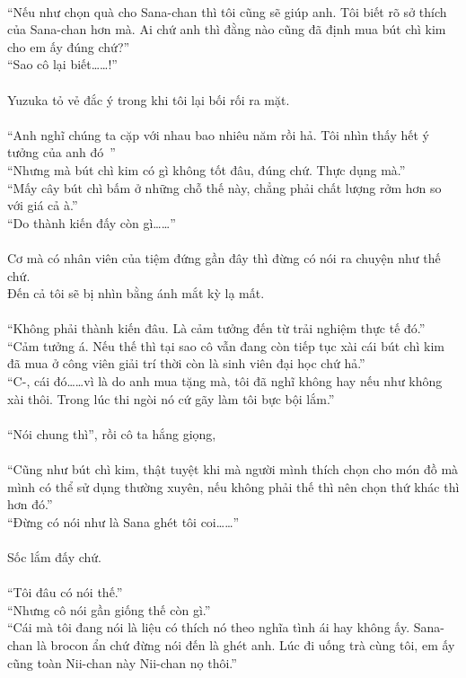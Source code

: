 \documentclass[12pt,a4paper, twosides]{book}
\begin{document}
\\
“Nếu như chọn quà cho Sana-chan thì tôi cũng sẽ giúp anh. Tôi biết rõ sở thích của Sana-chan hơn mà. Ai chứ anh thì đằng nào cũng đã định mua bút chì kim cho em ấy đúng chứ?”\\
“Sao cô lại biết……!”\\
\\
Yuzuka tỏ vẻ đắc ý trong khi tôi lại bối rối ra mặt.\\
\\
“Anh nghĩ chúng ta cặp với nhau bao nhiêu năm rồi hả. Tôi nhìn thấy hết ý tưởng của anh đó~”\\
“Nhưng mà bút chì kim có gì không tốt đâu, đúng chứ. Thực dụng mà.”\\
“Mấy cây bút chì bấm ở những chỗ thế này, chẳng phải chất lượng rởm hơn so với giá cả à.”\\
“Do thành kiến đấy còn gì……”\\
\\
Cơ mà có nhân viên của tiệm đứng gần đây thì đừng có nói ra chuyện như thế chứ.\\
Đến cả tôi sẽ bị nhìn bằng ánh mắt kỳ lạ mất.\\
\\
“Không phải thành kiến đâu. Là cảm tưởng đến từ trải nghiệm thực tế đó.”\\
“Cảm tưởng á. Nếu thế thì tại sao cô vẫn đang còn tiếp tục xài cái bút chì kim đã mua ở công viên giải trí thời còn là sinh viên đại học chứ hả.”\\
“C-, cái đó……vì là do anh mua tặng mà, tôi đã nghĩ không hay nếu như không xài thôi. Trong lúc thi ngòi nó cứ gãy làm tôi bực bội lắm.”\\
\\
“Nói chung thì”, rồi cô ta hắng giọng,\\
\\
“Cũng như bút chì kim, thật tuyệt khi mà người mình thích chọn cho món đồ mà mình có thể sử dụng thường xuyên, nếu không phải thế thì nên chọn thứ khác thì hơn đó.”\\
“Đừng có nói như là Sana ghét tôi coi……”\\
\\
Sốc lắm đấy chứ.\\
\\
“Tôi đâu có nói thế.”\\
“Nhưng cô nói gần giống thế còn gì.”\\
“Cái mà tôi đang nói là liệu có thích nó theo nghĩa tình ái hay không ấy. Sana-chan là brocon ẩn chứ đừng nói đến là ghét anh. Lúc đi uống trà cùng tôi, em ấy cũng toàn Nii-chan này Nii-chan nọ thôi.”\\
\end{document}
